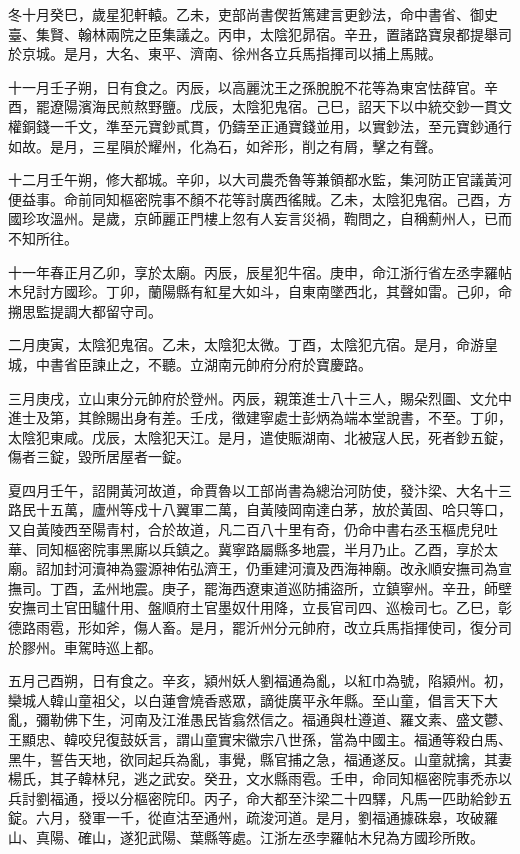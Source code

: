 \begin{pinyinscope}
 冬十月癸巳，歲星犯軒轅。乙未，吏部尚書偰哲篤建言更鈔法，命中書省、御史臺、集賢、翰林兩院之臣集議之。丙申，太陰犯昴宿。辛丑，置諸路寶泉都提舉司於京城。是月，大名、東平、濟南、徐州各立兵馬指揮司以捕上馬賊。



 十一月壬子朔，日有食之。丙辰，以高麗沈王之孫脫脫不花等為東宮怯薛官。辛酉，罷遼陽濱海民煎熬野鹽。戊辰，太陰犯鬼宿。己巳，詔天下以中統交鈔一貫文權銅錢一千文，準至元寶鈔貳貫，仍鑄至正通寶錢並用，以實鈔法，至元寶鈔通行如故。是月，三星隕於耀州，化為石，如斧形，削之有屑，擊之有聲。



 十二月壬午朔，修大都城。辛卯，以大司農禿魯等兼領都水監，集河防正官議黃河便益事。命前同知樞密院事不顏不花等討廣西徭賊。乙未，太陰犯鬼宿。己酉，方國珍攻溫州。是歲，京師麗正門樓上忽有人妄言災禍，鞫問之，自稱薊州人，已而不知所往。



 十一年春正月乙卯，享於太廟。丙辰，辰星犯牛宿。庚申，命江浙行省左丞孛羅帖木兒討方國珍。丁卯，蘭陽縣有紅星大如斗，自東南墜西北，其聲如雷。己卯，命搠思監提調大都留守司。



 二月庚寅，太陰犯鬼宿。乙未，太陰犯太微。丁酉，太陰犯亢宿。是月，命游皇城，中書省臣諫止之，不聽。立湖南元帥府分府於寶慶路。



 三月庚戌，立山東分元帥府於登州。丙辰，親策進士八十三人，賜朵烈圖、文允中進士及第，其餘賜出身有差。壬戌，徵建寧處士彭炳為端本堂說書，不至。丁卯，太陰犯東咸。戊辰，太陰犯天江。是月，遣使賑湖南、北被寇人民，死者鈔五錠，傷者三錠，毀所居屋者一錠。



 夏四月壬午，詔開黃河故道，命賈魯以工部尚書為總治河防使，發汴梁、大名十三路民十五萬，廬州等戍十八翼軍二萬，自黃陵岡南達白茅，放於黃固、哈只等口，又自黃陵西至陽青村，合於故道，凡二百八十里有奇，仍命中書右丞玉樞虎兒吐華、同知樞密院事黑廝以兵鎮之。冀寧路屬縣多地震，半月乃止。乙酉，享於太廟。詔加封河瀆神為靈源神佑弘濟王，仍重建河瀆及西海神廟。改永順安撫司為宣撫司。丁酉，孟州地震。庚子，罷海西遼東道巡防捕盜所，立鎮寧州。辛丑，師壁安撫司土官田驢什用、盤順府土官墨奴什用降，立長官司四、巡檢司七。乙巳，彰德路雨雹，形如斧，傷人畜。是月，罷沂州分元帥府，改立兵馬指揮使司，復分司於膠州。車駕時巡上都。



 五月己酉朔，日有食之。辛亥，潁州妖人劉福通為亂，以紅巾為號，陷潁州。初，欒城人韓山童祖父，以白蓮會燒香惑眾，謫徙廣平永年縣。至山童，倡言天下大亂，彌勒佛下生，河南及江淮愚民皆翕然信之。福通與杜遵道、羅文素、盛文鬱、王顯忠、韓咬兒復鼓妖言，謂山童實宋徽宗八世孫，當為中國主。福通等殺白馬、黑牛，誓告天地，欲同起兵為亂，事覺，縣官捕之急，福通遂反。山童就擒，其妻楊氏，其子韓林兒，逃之武安。癸丑，文水縣雨雹。壬申，命同知樞密院事禿赤以兵討劉福通，授以分樞密院印。丙子，命大都至汴梁二十四驛，凡馬一匹助給鈔五錠。六月，發軍一千，從直沽至通州，疏浚河道。是月，劉福通據硃皋，攻破羅山、真陽、確山，遂犯武陽、葉縣等處。江浙左丞孛羅帖木兒為方國珍所敗。




\end{pinyinscope}
